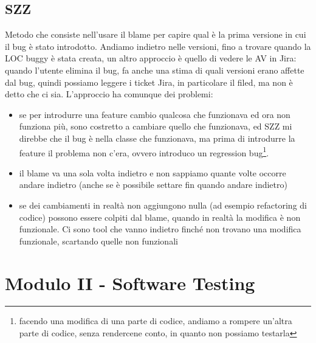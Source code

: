 \documentclass{article}
\begin{document}
\subsection{SZZ}
Metodo che consiste nell'usare il \textsf{blame} per capire qual è la prima versione in cui il bug è stato introdotto. Andiamo indietro nelle versioni, fino a trovare quando la LOC buggy è stata creata, un altro approccio è quello di vedere le AV in Jira: quando l'utente elimina il bug, fa anche una stima di quali versioni erano affette dal bug, quindi possiamo leggere i ticket Jira, in particolare il filed, ma non è detto che ci sia.
L'approccio ha comunque dei problemi: 
\begin{itemize}
\item se per introdurre una feature cambio qualcosa che funzionava ed ora non funziona più, sono costretto a cambiare quello che funzionava, ed SZZ mi direbbe che il bug è nella classe che funzionava, ma prima di introdurre la feature il problema non c'era, ovvero introduco un regression bug\footnote{facendo una modifica di una parte di codice, andiamo a rompere un'altra parte di codice, senza rendercene conto, in quanto non possiamo testarla}.
\item il blame va una sola volta indietro e non sappiamo quante volte occorre andare indietro (anche se è possibile settare fin quando andare indietro)
\item se dei cambiamenti in realtà non aggiungono nulla (ad esempio refactoring di codice) possono essere colpiti dal blame, quando in realtà la modifica è non funzionale. Ci sono tool che vanno indietro finché non trovano una modifica funzionale, scartando quelle non funzionali
\end{itemize}


\newpage


\section{Modulo II - Software Testing}
\end{document}
